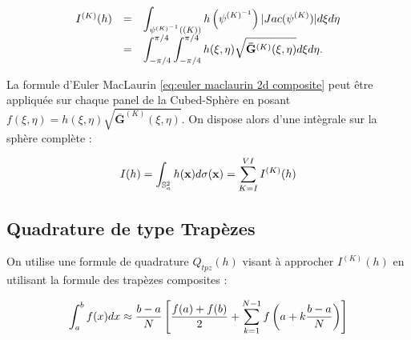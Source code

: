 \begin{equation}
\begin{array}{rcl}
I^{(K)}(h) & = &  \displaystyle\int_{\psi^{(K)^{-1}}\left((K)\right)}  h\left( \psi^{(K)^{-1}}\right) |Jac ( \psi^{(K)} )|d\xi d\eta \\
& = & \displaystyle\int_{-\pi/4}^{\pi/4}\displaystyle\int_{-\pi/4}^{\pi/4} h(\xi, \eta) \sqrt{\mathbf{\bar{G}}^{(K)}(\xi, \eta)} d \xi d \eta.
\end{array}
\end{equation}

La formule d'Euler MacLaurin \eqref{eq:euler maclaurin 2d composite} peut être appliquée sur chaque panel de la Cubed-Sphère en posant $f(\xi,\eta)=h(\xi,\eta)\sqrt{\mathbf{\bar{G}}^{(K)}(\xi, \eta)}$. On dispose alors d'une intègrale sur la sphère complète :

\begin{equation}
I(h)=\displaystyle\int_{\mathbb{S}_a^2} h(\mathbf{x})d\sigma(\mathbf{x}) = \displaystyle\sum\limits_{K = I}^{VI} I^{(K)}(h)
\end{equation}





































\subsection{Quadrature de type Trapèzes}  %

On utilise une formule de quadrature $Q_{tpz}(h)$ visant à approcher $I^{(K)}(h)$ en utilisant la formule des trapèzes composites :

\begin{equation}
\displaystyle\int_{a}^b f(x)dx \approx \dfrac{b-a}{N} \left[ \dfrac{f(a)+f(b)}{2} + \displaystyle\sum\limits_{k=1}^{N-1} f\left( a+k \dfrac{b-a}{N} \right) \right]
\label{eq:trapezes composites}
\end{equation}

